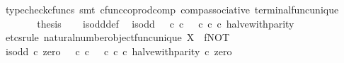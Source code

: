 \begin{isabellebody}
\ {\isacharparenleft}{\kern0pt}typecheck{\isacharunderscore}{\kern0pt}cfuncs{\isacharcomma}{\kern0pt}\ smt\ cfunc{\isacharunderscore}{\kern0pt}coprod{\isacharunderscore}{\kern0pt}comp\ comp{\isacharunderscore}{\kern0pt}associative{}\ terminal{\isacharunderscore}{\kern0pt}func{\isacharunderscore}{\kern0pt}unique{\isacharparenright}{\kern0pt}\isanewline
\ \ \ \ \isamarkupfalse%
\ \isamarkupfalse%
\ {\isacharquery}{\kern0pt}thesis\isacommand{{\isachardot}{\kern0pt}}\isamarkupfalse%
\isanewline
\ \ \isamarkupfalse%
\isanewline
{}\isamarkupfalse%
%
\endisatagproof
{\isafoldproof}%
%
\isadelimproof
\isanewline
%
\endisadelimproof
\isanewline
{}\isamarkupfalse%
\ is{\isacharunderscore}{\kern0pt}odd{\isacharunderscore}{\kern0pt}def{}{\isacharcolon}{\kern0pt}\isanewline
\ \ {\isachardoublequoteopen}is{\isacharunderscore}{\kern0pt}odd\ {\isacharequal}{\kern0pt}\ {\isacharparenleft}{\kern0pt}{\isacharparenleft}{\kern0pt}{\isasymf}\ {\isasymcirc}\isactrlsub c\ {\isasymbeta}\isactrlbsub {\isasymnat}\isactrlsub c\isactrlesub {\isacharparenright}{\kern0pt}\ {\isasymamalg}\ {\isacharparenleft}{\kern0pt}{\isasymt}\ {\isasymcirc}\isactrlsub c\ {\isasymbeta}\isactrlbsub {\isasymnat}\isactrlsub c\isactrlesub {\isacharparenright}{\kern0pt}{\isacharparenright}{\kern0pt}\ {\isasymcirc}\isactrlsub c\ halve{\isacharunderscore}{\kern0pt}with{\isacharunderscore}{\kern0pt}parity{\isachardoublequoteclose}\isanewline
%
\isadelimproof
%
\endisadelimproof
%
\isatagproof
{}\isamarkupfalse%
\ {\isacharparenleft}{\kern0pt}etcs{\isacharunderscore}{\kern0pt}rule\ natural{\isacharunderscore}{\kern0pt}number{\isacharunderscore}{\kern0pt}object{\isacharunderscore}{\kern0pt}func{\isacharunderscore}{\kern0pt}unique{\isacharbrackleft}{\kern0pt}\ X{\isacharequal}{\kern0pt}{\isasymOmega}{\isacharcomma}{\kern0pt}\ \ f{\isacharequal}{\kern0pt}NOT{\isacharbrackright}{\kern0pt}{\isacharparenright}{\kern0pt}\isanewline
\ \ \isamarkupfalse%
\ {\isachardoublequoteopen}is{\isacharunderscore}{\kern0pt}odd\ {\isasymcirc}\isactrlsub c\ zero\ {\isacharequal}{\kern0pt}\ {\isacharparenleft}{\kern0pt}{\isacharparenleft}{\kern0pt}{\isasymf}\ {\isasymcirc}\isactrlsub c\ {\isasymbeta}\isactrlbsub {\isasymnat}\isactrlsub c\isactrlesub {\isacharparenright}{\kern0pt}\ {\isasymamalg}\ {\isacharparenleft}{\kern0pt}{\isasymt}\ {\isasymcirc}\isactrlsub c\ {\isasymbeta}\isactrlbsub {\isasymnat}\isactrlsub c\isactrlesub {\isacharparenright}{\kern0pt}\ {\isasymcirc}\isactrlsub c\ halve{\isacharunderscore}{\kern0pt}with{\isacharunderscore}{\kern0pt}parity{\isacharparenright}{\kern0pt}\ {\isasymcirc}\isactrlsub c\ zero{\isachardoublequoteclose}\isanewline

\end{isabellebody}
